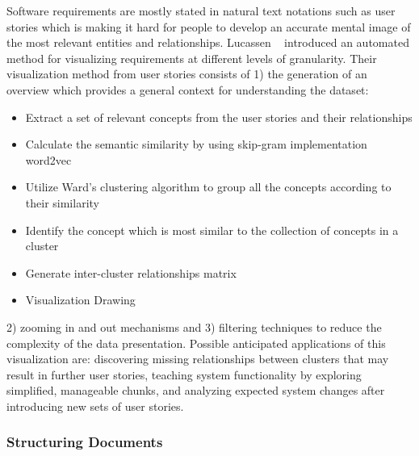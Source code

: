 Software requirements are mostly stated in natural text notations such as user
stories which is making it hard for people to develop an accurate mental image
of the most relevant entities and relationships. Lucassen
\etal~\cite{Lucassen:2016} introduced an automated method for visualizing
requirements at different levels of granularity. Their visualization method from
user stories consists of 1) the generation of an overview which provides a
general context for understanding the dataset:
\begin{itemize}
\item Extract a set of relevant concepts from the user stories and their relationships 
\item Calculate the semantic similarity by using skip-gram implementation word2vec
\item Utilize Ward’s clustering algorithm to group all the concepts according to their similarity 
\item Identify the concept which is most similar to the collection of concepts in a cluster
\item Generate inter-cluster relationships matrix
\item Visualization Drawing
\end{itemize}
2) zooming in and out mechanisms and 3) filtering techniques to reduce the
complexity of the data presentation. Possible anticipated applications of this
visualization are: discovering missing relationships between clusters that may
result in further user stories, teaching system functionality by exploring
simplified, manageable chunks, and analyzing expected system changes after
introducing new sets of user stories.

\subsubsection{Structuring Documents} 